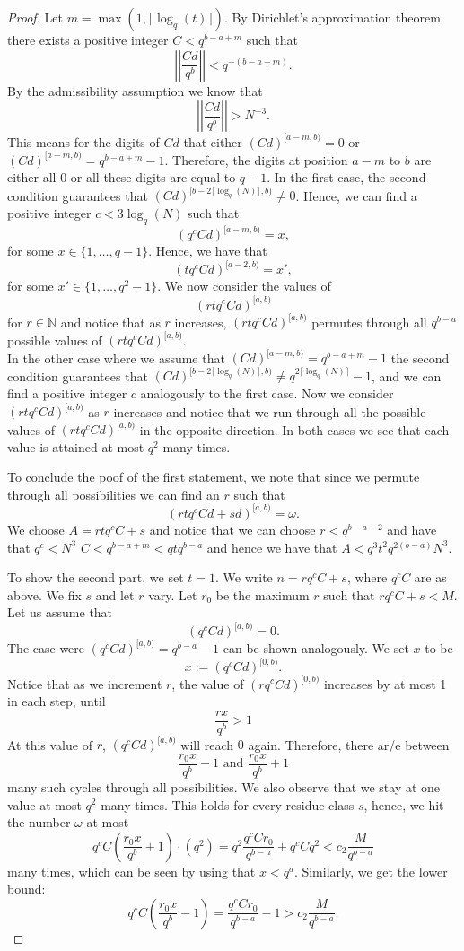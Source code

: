 \documentclass[12pt]{amsart}
\theoremstyle{definition}
\numberwithin{equation}{section}
\newcommand\NN{\mathbb{N}}
\numberwithin{equation}{section}
\begin{document}
\begin{proof}
	Let $m=\max(1,\lceil\log_q(t)\rceil)$. By Dirichlet's approximation theorem there exists a positive integer $C<q^{b-a+m}$ such that
	\[
		\left|\left|\frac{Cd}{q^b}\right|\right| < q^{-(b-a+m)}.
	\]
	By the admissibility assumption we know that
	\[
		\left|\left|\frac{Cd}{q^b}\right|\right| > N^{-3}.
	\]
	This means for the digits of $Cd$ that either $(Cd)^{[a-m,b)}=0$ or $(Cd)^{[a-m,b)}=q^{b-a+m}-1$. Therefore, the digits at position $a-m$ to $b$ are either all 0 or all these digits are equal to $\mathrel{{q}{-}{1}}$. In the first case, the second condition guarantees that $(Cd)^{[b-2\lceil\log_q(N)\rceil,b)}\neq 0$. Hence, we can find a positive integer $c< 3\log_q(N)$ such that
	\[
		(q^cCd)^{[a-m,b)} = x,
	\]
	for some $x\in \{1,\dots,\mathrel{{q}{-}{1}}\}$. Hence, we have that
	\[
		(tq^cCd)^{[a-2,b)} = x',
	\]
	for some $x'\in \{1,\dots,q^2-1\}$. We now consider the values of
	\[
		(rtq^cCd)^{[a,b)}
	\]
	for $r\in \NN$ and notice that as $r$ increases, $(rtq^cCd)^{[a,b)}$ permutes through all $q^{b-a}$ possible values of $(rtq^cCd)^{[a,b)}$.\\
	In the other case where we assume that $(Cd)^{[a-m,b)}=q^{b-a+m}-1$ the second condition guarantees that $(Cd)^{[b-2\lceil\log_q(N)\rceil,b)}\neq q^{2\lceil\log_q(N)\rceil}-1$, and we can find a positive integer $c$ analogously to the first case. Now we consider $(rtq^cCd)^{[a,b)}$ as $r$ increases and notice that we run through all the possible values of $(rtq^cCd)^{[a,b)}$ in the opposite direction. In both cases we see that each value is attained at most $q^2$ many times.
	
	To conclude the poof of the first statement, we note that since we permute through all possibilities we can find an $r$ such that
	\[
		(rtq^cCd+sd)^{[a,b)} = \omega.
	\]
	We choose $A=rtq^cC+s$ and notice that we can choose $r<q^{b-a+2}$ and have that $q^c<N^3$ $C<q^{b-a+m}<qtq^{b-a}$ and hence we have that $A<q^3t^2q^{2(b-a)}N^3$. 
	
	To show the second part, we set $t=1$. We write $n= rq^cC + s$, where $q^cC$ are as above. We fix $s$ and let $r$ vary. Let $r_0$ be the maximum $r$ such that $rq^cC + s<M$. Let us assume that 
	\[
		(q^cCd)^{[a,b)} = 0.
	\]	
	The case were $(q^cCd)^{[a,b)} = q^{b-a}-1$ can be shown analogously. We set $x$ to be
	\[
		x:= (q^cCd)^{[0,b)}.
	\]
	Notice that as we increment $r$, the value of $(rq^cCd)^{[0,b)}$ increases by at most 1 in each step, until
	\[
		\frac{rx}{q^b}>1
	\]
	At this value of $r$, $(q^cCd)^{[a,b)}$ will reach $0$ again. Therefore, there ar/e between
	\[
		\frac{r_0x}{q^b} - 1 \text{ and } \frac{r_0x}{q^b} + 1
	\]
	many such cycles through all possibilities. We also observe that we stay at one value at most $q^2$ many times. This holds for every residue class $s$, hence, we hit the number $\omega$ at most
	\[
		q^cC\left(\frac{r_0x}{q^b} + 1\right)\cdot\left(q^2\right) = q^2\frac{q^cCr_0}{q^{b-a}} + q^cCq^2 < c_2 \frac{M}{q^{b-a}}
	\]
	many times, which can be seen by using that $x<q^a$. Similarly, we get the lower bound:
	\[
		q^cC\left(\frac{r_0x}{q^b}-1\right) = \frac{q^cCr_0}{q^{b-a}} -1 > c_2 \frac{M}{q^{b-a}}.
	\]
\end{proof}
\end{document}
